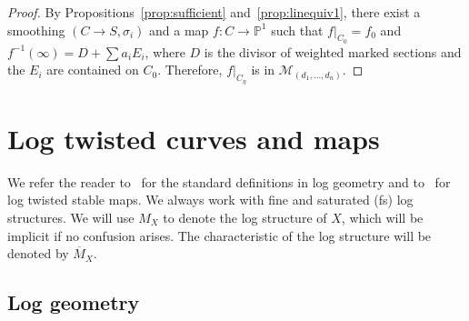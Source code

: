 \documentclass[11pt]{amsart}
\numberwithin{equation}{section}
\theoremstyle{definition}
\theoremstyle{remark}
\newcommand{\bP}{{\mathbb P}}
\newcommand{\mapsd}{\mathcal{M}_{(d_1, \ldots, d_n)}}
\begin{document}
\begin{proof} By Propositions~\ref{prop:sufficient} and~\ref{prop:linequiv1}, there exist a smoothing $(C \to S, \sigma_i)$ and a map $f \colon C \to \bP^1$ such that $f|_{C_0} = f_0$ and $f^{-1}(\infty) = D + \sum a_iE_i$, where $D$ is the divisor of weighted marked sections and the $E_i$ are contained on $C_0$. Therefore, $f|_{C_\eta}$ is in $\mapsd$. 
\end{proof} 



\section{Log twisted curves and maps}

We refer the reader to~\cite{HoM} for the standard definitions in log geometry and to~\cite[Section 2]{logGLSM} for log twisted stable maps. We always work with fine and saturated (fs) log structures. We will use $M_X$ to denote the log structure of $X$, which will be implicit if no confusion arises. The characteristic of the log structure will be denoted by $\overline{M}_X$. 

\subsection{Log geometry}\label{sec:log}
\end{document}
